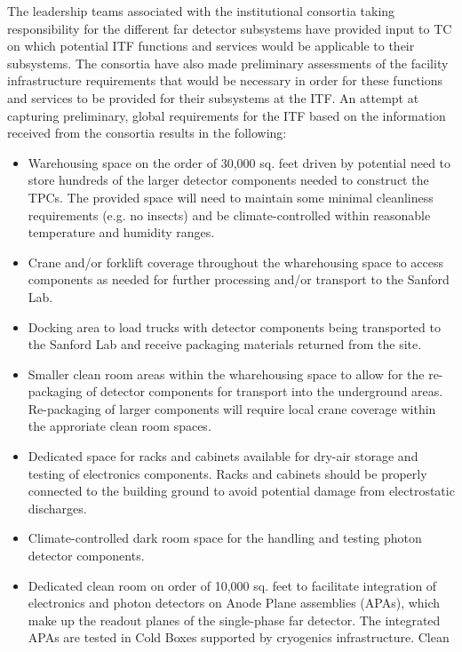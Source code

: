 The leadership teams associated with the  institutional consortia
taking responsibility for the different far detector subsystems have provided 
input to TC on which potential ITF functions and services would be applicable 
to their subsystems.  The consortia have also made preliminary assessments of 
the facility infrastructure requirements that would be necessary in order for 
these functions and services to be provided for their subsystems at the ITF.
An attempt at capturing preliminary, global requirements for the ITF based 
on the information received from the consortia results in the following:
\begin{itemize}
  \item Warehousing space on the order of 30,000 sq. feet driven by potential 
    need to store hundreds of the larger detector components needed to construct
    the TPCs.  The provided space will need to maintain some minimal cleanliness 
    requirements (e.g. no insects) and be climate-controlled within reasonable 
    temperature and humidity ranges.
  \item Crane and/or forklift coverage throughout the wharehousing space to 
    access components as needed for further processing and/or transport to the 
    Sanford Lab.
  \item Docking area to load trucks with detector components being transported 
    to the Sanford Lab and receive packaging materials returned from the site. 
  \item Smaller clean room areas within the wharehousing space to allow for 
    the re-packaging of detector components for transport into the underground 
    areas.  Re-packaging of larger components will require local crane coverage 
    within the approriate clean room spaces.
  \item Dedicated space for racks and cabinets available for dry-air storage 
    and testing of electronics components.  Racks and cabinets should be properly 
    connected to the building ground to avoid potential damage from electrostatic 
    discharges.
  \item Climate-controlled dark room space for the handling and testing photon
    detector components.
  \item Dedicated clean room on order of 10,000 sq. feet to facilitate integration 
    of electronics and photon detectors on Anode Plane assemblies (APAs), which 
    make up the readout planes of the single-phase far detector. The integrated 
    APAs are tested in Cold Boxes supported by cryogenics infrastructure.  Clean 

\end{itemize}

